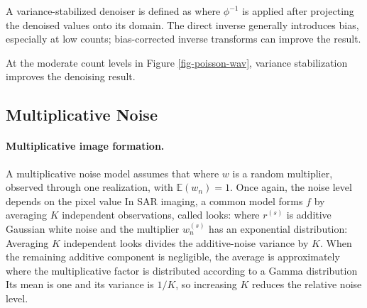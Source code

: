 
A variance-stabilized denoiser is defined as
where $\phi^{-1}$ is applied after projecting the denoised values onto its domain. The direct inverse generally introduces bias, especially at low counts; bias-corrected inverse transforms can improve the result.

At the moderate count levels in Figure \ref{fig-poisson-wav}, variance stabilization improves the denoising result.


                                                     
\subsection{Multiplicative Noise}

  
\paragraph{Multiplicative image formation.}

A multiplicative noise model assumes that
where $w$ is a random multiplier, observed through one realization, with $\mathbb E(w_n)=1$.
Once again, the noise level depends on the pixel value
In SAR imaging, a common model forms $f$ by averaging $K$ independent observations, called looks:
where $r^{(s)}$ is additive Gaussian white noise and the multiplier $w^{(s)}_n$ has an exponential distribution:
Averaging $K$ independent looks divides the additive-noise variance by $K$. When the remaining additive component is negligible, the average is approximately
where the multiplicative factor is distributed according to a Gamma distribution
Its mean is one and its variance is $1/K$, so increasing $K$ reduces the relative noise level.

